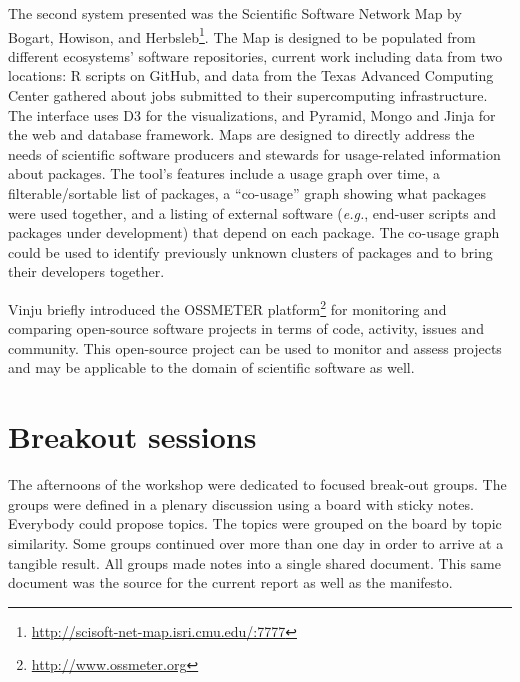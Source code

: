 \documentclass[a4paper,UKenglish]{dagrep}
\newcommand{\eg}{\emph{e.g.},\xspace}
\begin{document}
The second system presented was the Scientific Software Network Map by Bogart, Howison, and Herbsleb\footnote{\url{http://scisoft-net-map.isri.cmu.edu/:7777}}. The Map is designed to be populated from different ecosystems' software repositories, current work including data from two locations: R scripts on GitHub, and data from the Texas Advanced Computing Center gathered about jobs submitted to their supercomputing infrastructure.  The interface uses D3 for the visualizations, and Pyramid, Mongo and Jinja for the web and database framework. Maps are designed to directly address the needs of scientific software producers and stewards for usage-related information about packages. The tool's features include a usage graph over time, a filterable/sortable list of packages, a ``co-usage'' graph showing what packages were used together, and a listing of external software (\eg end-user scripts and packages under development) that depend on each package. The co-usage graph could be used to identify previously unknown clusters of packages and to bring their developers together.


Vinju briefly introduced the OSSMETER platform\footnote{\url{http://www.ossmeter.org}} for monitoring and comparing open-source software projects in terms of code, activity, issues and community. This open-source project can be used to monitor and assess projects and may be applicable to the domain of scientific software as well.




\section{Breakout sessions}

The afternoons of the workshop were dedicated to focused break-out groups. The groups were defined in a plenary discussion using a board with sticky notes. Everybody could propose topics. The topics were grouped on the board by topic similarity. Some groups continued over more than one day in order to arrive at a tangible result. All groups made notes into a single shared document. This same document was the source for the current report as well as the manifesto.
\end{document}

